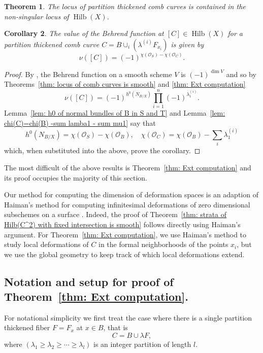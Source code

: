 \documentclass[12pt]{amsart}
\newtheorem{theorem}{Theorem}%
\newtheorem{corollary}[theorem]{Corollary}
\theoremstyle{definition}
\renewcommand{\O}{\mathcal{O}}
\newcommand{\Hilb}{\operatorname{Hilb}}
\begin{document}
\begin{theorem}\label{thm: locus of comb curves is smooth}
The locus of partition thickened comb curves is contained in the
non-singular locus of $\Hilb (X)$.
\end{theorem}

\begin{corollary}\label{cor: value of Behrend function at comb curves}
The value of the Behrend function at $[C]\in \Hilb (X)$ for a
partition thickened comb curve $C =
B\cup_{i}\left(\lambda^{(i)}F_{x_{i}} \right)$ is given by
\[
\nu ([C]) = (-1)^{\chi (\O_{S})-\chi (\O_{C})}.
\]
\end{corollary}
\begin{proof}
By \cite{Behrend-micro}, the Behrend function on a smooth scheme $V$
is $(-1)^{\dim V}$ and so by Theorems~\ref{thm: locus of comb curves
is smooth} and \ref{thm: Ext computation}
\[
\nu ([C]) = (-1)^{h^{0}(N_{B/X}) }\prod_{i=1}^{n} (-1)^{\lambda_{1}^{(i)}}. 
\]
Lemma~\ref{lem: h0 of normal bundles of B in S and T} and
Lemma~\ref{lem: chi(C)=chi(B) -sum lamba1 - sum mu1} say that
\[
h^{0}(N_{B/X}) = \chi (\O_{S}) - \chi (\O_{B}), \quad \chi (\O_{C}) =
\chi(\O_{B}) - \sum_{i} \lambda^{(i)}_{1}
\]
which, when substituted into the above, prove the corollary. 
\end{proof}
The most difficult of the above results is Theorem~\ref{thm: Ext
computation} and its proof occupies the majority of this section.

Our method for computing the dimension of deformation spaces is an
adaption of Haiman's method for computing infinitesimal deformations
of zero dimensional subschemes on a surface \cite{Haiman1998}. Indeed,
the proof of Theorem~\ref{thm: strata of Hilb(C^2) with fixed
intersection is smooth} follows directly using Haiman's argument. For
Theorem~\ref{thm: Ext computation}, we use Haiman's method to study
local deformations of $C$ in the formal neighborhoods of the points
$x_{i}$, but we use the global geometry to keep track of which local
deformations extend.

\subsection{Notation and setup for proof of Theorem~\ref{thm: Ext
computation}.}

For notational simplicity we first treat the case where there is a
single partition thickened fiber $F=F_{x}$ at $x\in B$, that is
\[
C=B\cup \lambda F,
\]
where $(\lambda_{1}\geq \lambda_{2}\geq \dotsb \geq \lambda_{l})$ is
an integer partition of length $l$.
\end{document}
